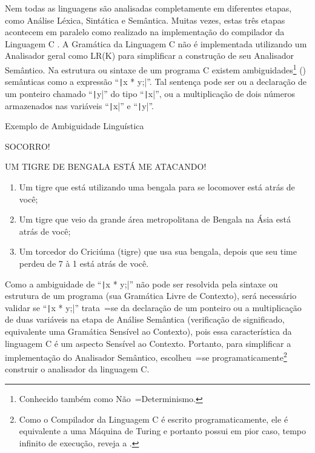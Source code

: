 Nem todas as linguagens são analisadas completamente em diferentes etapas,
como Análise Léxica, Sintática e Semântica. Muitas vezes,
estas três etapas acontecem em paralelo como realizado na implementação do compilador da Linguagem C \cite{jourdan2017,whyCcannotBeParsedWithALR1Parser}.
A Gramática da Linguagem C não é implementada utilizando um Analisador geral como LR(K) para simplificar a construção de seu Analisador Semântico.
Na estrutura ou
sintaxe de um programa C existem ambiguidades\footnote{
Conhecido também como Não~=Determinismo.
}
() semânticas como a expressão ``\texttt|x * y;|''.
Tal sentença pode ser ou
a declaração de um ponteiro chamado ``\texttt|y|'' do tipo ``\texttt|x|'',
ou a multiplicação de dois números armazenados nas variáveis ``\texttt|x|'' e
``\texttt|y|''.
\begin{quadro}[!htb]
\caption{Exemplo de Ambiguidade Linguística}
\label{frame:exemploDeAmbiguidadeLinguistica}
\begin{bluebox}
    SOCORRO!

    UM TIGRE DE BENGALA ESTÁ ME ATACANDO!

    \begin{enumerate}%
        \item Um tigre que está utilizando uma bengala para se locomover está atrás de você;
        \item Um tigre que veio da grande área metropolitana de Bengala na Ásia está atrás de você;
        \item Um torcedor do Criciúma (tigre) que usa sua bengala,
        depois que seu time perdeu de 7 à 1 está atrás de você.
    \end{enumerate}
\end{bluebox}
\end{quadro}

Como a ambiguidade de ``\texttt|x * y;|'' não pode ser resolvida pela sintaxe ou
estrutura de um programa (sua Gramática Livre de Contexto),
será necessário validar se ``\texttt|x * y;|'' trata~=se da declaração de um ponteiro ou
a multiplicação de duas variáveis na etapa de Análise Semântica (verificação de significado,
equivalente uma Gramática Sensível ao Contexto),
pois essa característica da linguagem C é um aspecto Sensível ao Contexto.
Portanto,
para simplificar a implementação do Analisador Semântico,
escolheu~=se programaticamente\footnote{
Como o Compilador da Linguagem C é escrito programaticamente,
ele é equivalente a uma Máquina de Turing e
portanto possui em pior caso,
tempo infinito de execução,
reveja a .
}
construir o analisador da linguagem C.

